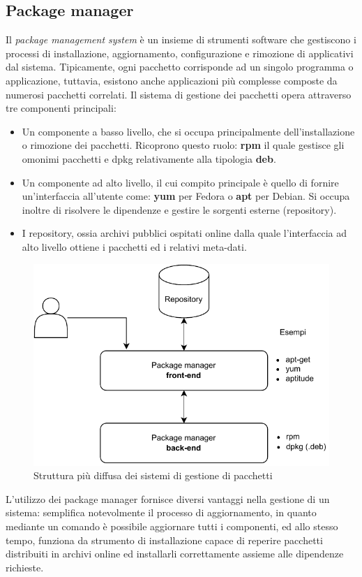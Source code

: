 \subsection{Package manager}

Il \textit{package management system} è un insieme di strumenti software che gestiscono i processi di installazione, aggiornamento, configurazione e rimozione di applicativi dal sistema. Tipicamente, ogni pacchetto corrisponde ad un singolo programma o applicazione, tuttavia, esistono anche applicazioni più complesse composte da numerosi pacchetti correlati. Il sistema di gestione dei pacchetti opera attraverso tre componenti principali:

\begin{itemize}
	\item Un componente a basso livello, che si occupa principalmente dell'installazione o rimozione dei pacchetti. Ricoprono questo ruolo: \textbf{rpm} il quale gestisce gli omonimi pacchetti e dpkg relativamente alla tipologia \textbf{deb}.
	\item Un componente ad alto livello, il cui compito principale è quello di fornire un'interfaccia all'utente come: \textbf{yum} per Fedora o \textbf{apt} per Debian. Si occupa inoltre di risolvere le dipendenze e gestire le sorgenti esterne (repository).
	\item I repository, ossia archivi pubblici ospitati online dalla quale l'interfaccia ad alto livello ottiene i pacchetti ed i relativi meta-dati.
\end{itemize}

\begin{figure}[H]
	\centering
	\includegraphics[width=.7\linewidth]{figures/package-managers.pdf}
	\caption{Struttura più diffusa dei sistemi di gestione di pacchetti}
	\label{fig:package-managers}
\end{figure}

L'utilizzo dei package manager fornisce diversi vantaggi nella gestione di un sistema: semplifica notevolmente il processo di aggiornamento, in quanto mediante un comando è possibile aggiornare tutti i componenti, ed allo stesso tempo, funziona da strumento di installazione capace di reperire pacchetti distribuiti in archivi online ed installarli correttamente assieme alle dipendenze richieste. 
